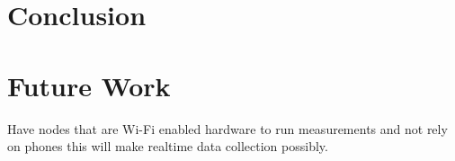 \section{Conclusion}\label  {sec:conclusion}
\section{Future Work}\label{sec:future-work}
Have nodes that are Wi-Fi enabled hardware to run measurements and not rely on phones this will make realtime data collection possibly.